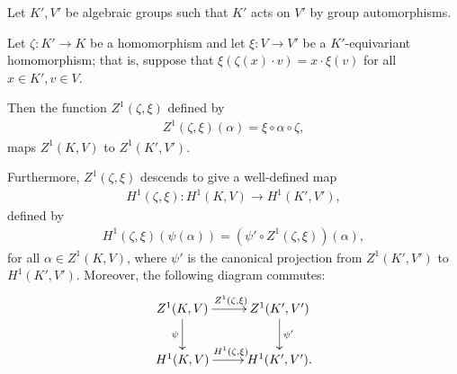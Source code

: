 \begin{lemma} \label{h1maps} Let $K', V'$ be algebraic groups such that $K'$ acts on $V'$ by group automorphisms.

	Let $\zeta:K' \rightarrow K$ be a homomorphism and let $\xi: V \rightarrow V'$ be a $K'$-equivariant homomorphism; that is, suppose that $\xi(\zeta(x) \cdot v) = x \cdot \xi(v)$ for all $x \in K', v \in V$.

	Then the function $Z^1(\zeta, \xi)$ defined by
	\begin{align*}
		Z^1(\zeta, \xi)(\alpha) = \xi \circ \alpha \circ \zeta,
	\end{align*}
	maps $Z^1(K, V)$ to $Z^1(K', V')$.

	Furthermore, $Z^1(\zeta, \xi)$ descends to give a well-defined map
	\begin{align*}
		H^1(\zeta, \xi):H^1(K, V) \rightarrow H^1(K', V'),
	\end{align*}
	defined by
	\begin{align*}
		H^1(\zeta, \xi)(\psi(\alpha)) = \left(\psi' \circ Z^1(\zeta, \xi)\right)(\alpha),
	\end{align*}
	for all $\alpha \in Z^1(K, V)$, where $\psi'$ is the canonical projection from $Z^1(K', V')$ to $H^1(K', V')$.
	Moreover, the following diagram commutes:
	\begin{align*}
		\xymatrix{
			Z^1(K, V) \ar[r]^{Z^1(\zeta, \xi)} \ar[d]_{\psi} & Z^1(K', V') \ar[d]^{\psi'} \\
			H^1(K, V) \ar[r]^{H^1(\zeta, \xi)}               & H^1(K', V').
		}
	\end{align*}
\end{lemma}
